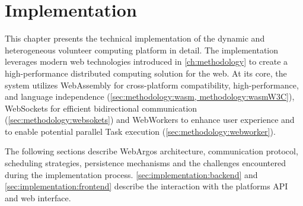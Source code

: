 \chapter{Implementation}
\label{ch:implementation}
This chapter presents the technical implementation of the dynamic and heterogeneous volunteer computing platform in detail. The implementation leverages modern web technologies introduced in \autoref{ch:methodology} to create a high-performance distributed computing solution for the web. At its core, the system utilizes WebAssembly for cross-platform compatibility, high-performance, and language independence (\autoref{sec:methodology:wasm, methodology:wasmW3C}), WebSockets for efficient bidirectional communication (\autoref{sec:methodology:websokets}) and WebWorkers to enhance user experience and to enable potential parallel Task execution (\autoref{sec:methodology:webworker}).

The following sections describe WebArgos architecture, communication protocol, scheduling strategies, persistence mechanisms and the challenges encountered during the implementation process. \autoref{sec:implementation:backend} and \autoref{sec:implementation:frontend} describe the interaction with the platforms API and web interface.

